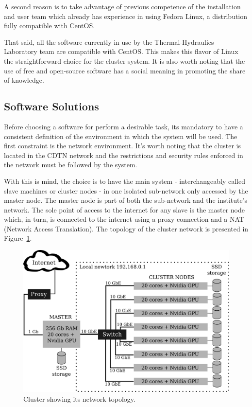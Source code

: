 \documentclass[twoside,a4paper,12pt,english]{inac17}
\begin{document}
A second reason is to take advantage of previous competence of the installation and user team which already has experience
in using Fedora Linux, a distribution fully compatible with CentOS.

That said, all the software currently in use by the Thermal-Hydraulics Laboratory team are compatible with CentOS. This
makes this flavor of Linux the straightforward choice for the cluster system. It is also worth noting that the use of
free and open-source software has a social meaning in promoting the share of knowledge.

\subsection{Software Solutions}
\label{sub:ssol}

Before choosing a software for perform a desirable task, its mandatory to have a consistent definition of the environment
in which the system will be used. The first constraint is the network environment. It's worth noting that the cluster is
located in the CDTN network and the restrictions and security rules enforced in the network must be followed by the system.

With this is mind, the choice is to have the main system - interchangeably called slave machines or cluster nodes - in one isolated sub-network only accessed by
the master node. The master node is part of both the sub-network and the institute's network. The sole point of access to the
internet for any slave is the master node which, in turn, is connected to the internet using a proxy connection and a
NAT (Network Access Translation). The topology of the cluster network is presented in Figure~\ref{fig:esquema-cluster}.

\begin{figure}[h] %
  \centering\includegraphics[scale=0.7]{images/cluster-rede.png}
  \caption{Cluster showing its network topology.}
  \label{fig:esquema-cluster}
\end{figure}
\end{document}
